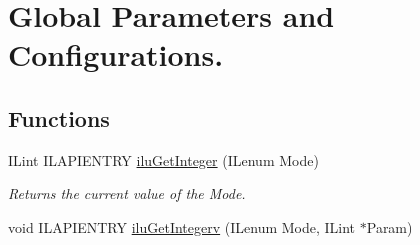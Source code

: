 \hypertarget{group__ilu__state}{\section{Global Parameters and Configurations.}
\label{group__ilu__state}
}
\subsection*{Functions}
\begin{DoxyCompactItemize}
\item 
I\-Lint I\-L\-A\-P\-I\-E\-N\-T\-R\-Y \hyperlink{group__ilu__state_gaecb69a456d72f9c6c449604217142710}{ilu\-Get\-Integer} (I\-Lenum Mode)
\begin{DoxyCompactList}\small\item\em Returns the current value of the {\itshape Mode}. \end{DoxyCompactList}\item 
\hypertarget{group__ilu__state_gad63d708dd1c58cc0c0ef857119879b6d}{void I\-L\-A\-P\-I\-E\-N\-T\-R\-Y \hyperlink{group__ilu__state_gad63d708dd1c58cc0c0ef857119879b6d}{ilu\-Get\-Integerv} (I\-Lenum Mode, I\-Lint $\ast$Param)}\label{group__ilu__state_gad63d708dd1c58cc0c0ef857119879b6d}


\end{DoxyCompactItemize}
